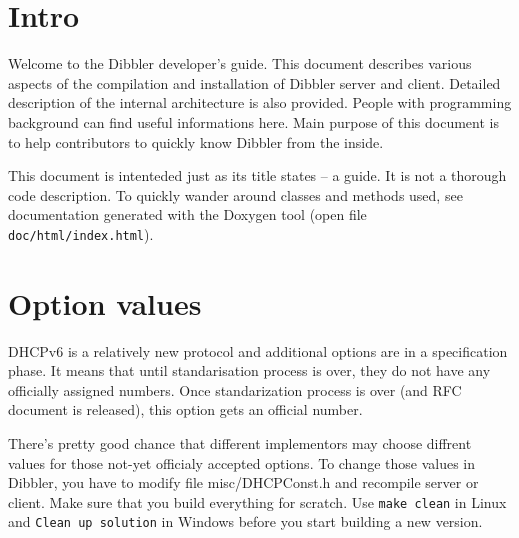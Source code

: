 
\section{Intro}
Welcome to the Dibbler developer's guide. This document describes
various aspects of the compilation and installation of Dibbler server
and client. Detailed description of the internal architecture is also
provided. People with programming background can find useful
informations here. Main purpose of this document is to help
contributors to quickly know Dibbler from the inside.

This document is intenteded just as its title states -- a guide. It is
not a thorough code description. To quickly wander around classes and
methods used, see documentation generated with the Doxygen tool (open
file \verb+doc/html/index.html+).

\section{Option values}
\A DHCPv6 is a relatively new protocol and additional options are in a
specification phase. It means that until standarisation process is
over, they do not have any officially assigned numbers. Once
standarization process is over (and RFC document is released), this
option gets an official number. 

There's pretty good chance that different implementors may choose
diffrent values for those not-yet officialy accepted options. To
change those values in Dibbler, you have to modify file
misc/DHCPConst.h and recompile server or client. Make sure that you
build everything for scratch. Use \verb+make clean+ in Linux and
\verb+Clean up solution+ in Windows before you start building a new
version.
